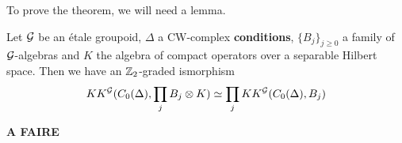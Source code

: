 To prove the theorem, we will need a lemma.\\

\begin{lem}
Let $\mathcal G$ be an étale groupoid, $\Delta$ a CW-complex \textbf{conditions}, $\{B_j\}_{j\geq 0}$ a family of $\mathcal G$-algebras and $K$ the algebra of compact operators over a separable Hilbert space. Then we have an $\mathbb Z_2$-graded ismorphism 
\[KK^\mathcal G(C_0(\Delta),\prod_j B_j\otimes K)\simeq \prod_j KK^\mathcal G(C_0(\Delta),B_j)\]
\end{lem}

\begin{dem}
\textbf{A FAIRE}
\end{dem}








































